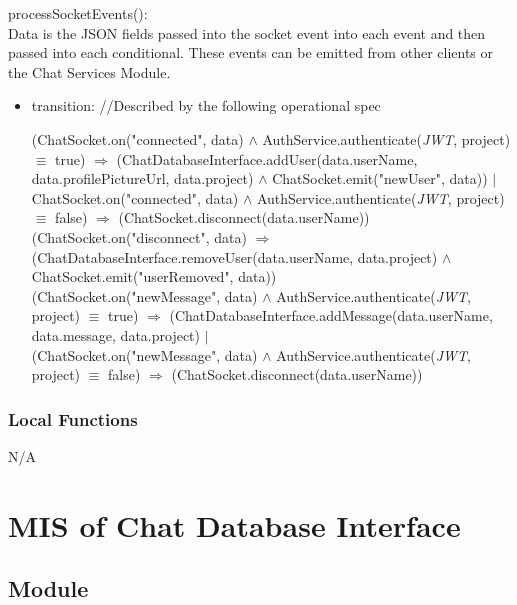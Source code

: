 \documentclass[12pt, titlepage]{article}
\begin{document}
	\noindent processSocketEvents():\\
	
	\noindent Data is the JSON fields passed into the socket event into each event and then passed into each conditional. These events can be emitted from other clients or the Chat Services Module.
	
	\begin{itemize}
		
		\item transition: //Described by the following operational spec
		
		(ChatSocket.on("connected", data) $\land$ AuthService.authenticate(\textit{JWT}, project) $\equiv$ true) $\Rightarrow$ (ChatDatabaseInterface.addUser(data.userName, data.profilePictureUrl, data.project) $\land$ ChatSocket.emit("newUser", data)) $|$\\
		ChatSocket.on("connected", data) $\land$ AuthService.authenticate(\textit{JWT}, project) $\equiv$ false) $\Rightarrow$ (ChatSocket.disconnect(data.userName))\\
		
		(ChatSocket.on("disconnect", data) $\Rightarrow$ (ChatDatabaseInterface.removeUser(data.userName, data.project) $\land$ ChatSocket.emit("userRemoved", data))\\
		
		(ChatSocket.on("newMessage", data) $\land$ AuthService.authenticate(\textit{JWT}, project) $\equiv$ true) $\Rightarrow$ (ChatDatabaseInterface.addMessage(data.userName, data.message, data.project) $|$\\
		(ChatSocket.on("newMessage", data) $\land$ AuthService.authenticate(\textit{JWT}, project) $\equiv$ false) $\Rightarrow$ (ChatSocket.disconnect(data.userName))
		
	\end{itemize}
	
	\subsubsection{Local Functions}
	
	N/A
	
	\newpage
	
	\section{MIS of Chat Database Interface} \label{Module}
	
	\subsection{Module}
	
\end{document}
